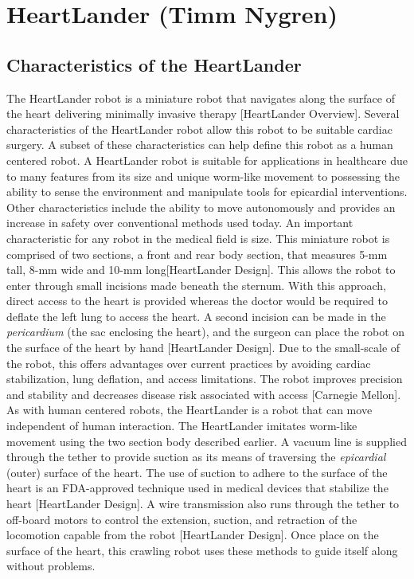 \documentclass[11pt,conference]{IEEEtran}
\begin{document}
\section{ HeartLander (Timm Nygren)}

\subsection { Characteristics of the HeartLander }
\indent The HeartLander robot is a miniature robot that navigates along the surface of the heart delivering minimally invasive therapy [HeartLander Overview]. Several characteristics of the HeartLander robot allow this robot to be suitable cardiac surgery. A subset of these characteristics can help define this robot as a human centered robot. A HeartLander robot is suitable for applications in healthcare due to many features from its size and unique worm-like movement to possessing the ability to sense the environment and manipulate tools for epicardial interventions. Other characteristics include the ability to move autonomously and provides an increase in safety over conventional methods used today.
\newline
\indent An important characteristic for any robot in the medical field is size. This  miniature robot is comprised of two sections, a front and rear body section, that measures 5-mm tall, 8-mm wide and 10-mm long[HeartLander Design]. This allows the robot to enter through small incisions made beneath the sternum. With this approach, direct access to the heart is provided whereas the doctor would be required to deflate the left lung to access the heart. A second incision can be made in the \textit{pericardium} (the sac enclosing the heart), and the surgeon can place the robot on the surface of the heart by hand [HeartLander Design]. Due to the small-scale of the robot, this offers advantages over current practices by avoiding cardiac stabilization, lung deflation, and access limitations. The robot improves precision and stability and decreases disease risk associated with access [Carnegie Mellon].
\newline
\indent As with human centered robots, the HeartLander is a robot that can move independent of human interaction. The HeartLander imitates worm-like movement using the two section body described earlier. A vacuum line is supplied through the tether to provide suction as its means of traversing the \textit{epicardial} (outer) surface of the heart. The use of suction to adhere to the surface of the heart is an FDA-approved technique used in medical devices that stabilize the heart [HeartLander Design]. A wire transmission also runs through the tether to off-board motors to control the extension, suction, and retraction of the locomotion capable from the robot [HeartLander Design]. Once place on the surface of the heart, this crawling robot uses these methods to guide itself along without problems.
\end{document}
